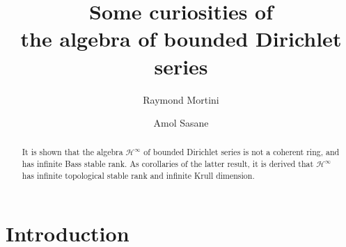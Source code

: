 \documentclass[11pt,reqno]{amsart}
\numberwithin{equation}{section}
\theoremstyle{definition}
\theoremstyle{definition}
\theoremstyle{definition}
\begin{document}


\title[On the algebra of bounded Dirichlet series]{Some curiosities of \\
the algebra of bounded Dirichlet series}

\author{Raymond Mortini}
\address{Universit\'{e} de Lorraine\\ 
D\'{e}partement de Math\'{e}matiques et Institut \'Elie Cartan de Lorraine,  UMR 7502\\
Ile du Saulcy\\ F-57045 Metz, France}
 
\author{Amol Sasane}
\address{Department of Mathematics, 
London School of Economics, 
Houghton Street, London WC2A 2AE, U.K.}

\begin{abstract}
  It is shown that the algebra ${{{\mathscr{H}}^{\infty}}}$ of bounded Dirichlet series is
  not a coherent ring, and has infinite Bass stable rank.  As
  corollaries of the latter result, it is derived that ${{{\mathscr{H}}^{\infty}}}$ has
  infinite topological stable rank and infinite Krull dimension.
\end{abstract}

\maketitle

\section{Introduction}
\end{document}
